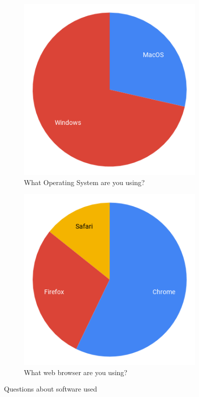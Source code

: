 \documentclass[ %
                    author={Aleena Baig},
                supervisor={Dr Simon Lock},
                    degree={BSc},
                     title={On Making Web Accessible Graphs},
                  subtitle={},
                      year={2019} ]{dissertation}
\begin{document}
\begin{figure}[h]
  \centering
  \begin{subfigure}[b]{0.4\linewidth}
    \centering
    \includegraphics[width=0.75\linewidth]{images/OperatingSystem.png}
     \caption{What Operating System are you using?}
  \end{subfigure}
  \begin{subfigure}[b]{0.4\linewidth}
    \centering
    \includegraphics[width=0.75\linewidth]{images/WebBrowser.png}
    \caption{What web browser are you using?}
  \end{subfigure}
  \caption{Questions about software used}
  \label{fig:backgroundquestions}
\end{figure}
\end{document}
